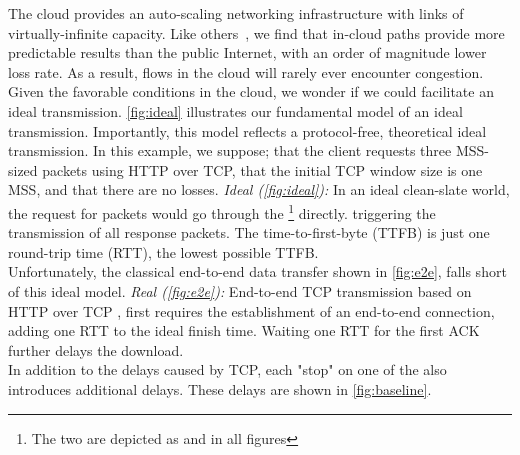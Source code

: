 The cloud provides an auto-scaling networking infrastructure with links of virtually-infinite capacity. Like others~\cite{haq2017measuring}, we find that in-cloud paths provide more predictable results than the public Internet, with an order of magnitude lower loss rate. As a result, flows in the cloud will rarely ever encounter congestion. Given the favorable conditions in the cloud, we wonder if we could facilitate an ideal transmission. \autoref{fig:ideal} illustrates our fundamental model of an ideal transmission. Importantly, this model reflects a protocol-free, theoretical ideal transmission.
In this example, we suppose; that the client requests three MSS-sized packets using HTTP over TCP, that the initial TCP window size is one MSS, and that there are no losses.
 \textit{Ideal (\autoref{fig:ideal}):} In an ideal clean-slate world, the request for packets would go through the \relays{}\footnote{The two \relays are depicted as \rc and \rs in all figures} directly.   triggering the transmission of all response packets. The time-to-first-byte (TTFB) is just one round-trip time (RTT), the lowest possible TTFB. \\
Unfortunately, the classical end-to-end data transfer shown in \autoref{fig:e2e}, falls short of this ideal model.
 \textit{Real (\autoref{fig:e2e}):} End-to-end TCP transmission based on HTTP over TCP , first requires the establishment of an end-to-end connection, adding one RTT to the ideal finish time. Waiting one RTT for the first ACK further delays the download.\\ 
In addition to the delays caused by TCP, each "stop" on one of the \relays also introduces additional delays. These delays are shown in \autoref{fig:baseline}.
